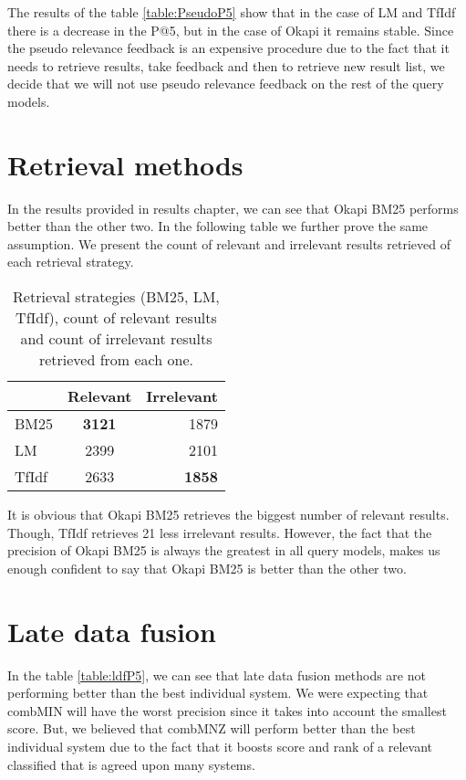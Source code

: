 The results of the table \ref{table:PseudoP5} show that in the case of LM and TfIdf there is a decrease in the P@5, but in the case of Okapi it remains stable. Since the pseudo relevance feedback is an expensive procedure due to the fact that it needs to retrieve results, take feedback and then to retrieve new result list, we decide that we will not use pseudo relevance feedback on the rest of the query models.



\section{Retrieval methods}

In the results provided in results chapter, we can see that Okapi BM25 performs better than the other two. In the following table we further prove the same assumption. We present the count of relevant and irrelevant results retrieved of each retrieval strategy.

\begin{table}[H]
\begin{center}
\caption{Retrieval strategies (BM25, LM, TfIdf), count of relevant results and count of irrelevant results retrieved from each one.}

\begin{tabular}{lcr}
\midrule
 & Relevant & Irrelevant  \\
\midrule
	BM25 & \textbf{3121} & 1879 \\
	LM & 2399 & 2101 \\
	TfIdf & 2633 & \textbf{1858} \\
\bottomrule
\end{tabular}
\end{center}
\end{table}

It is obvious that Okapi BM25 retrieves the biggest number of relevant results. Though, TfIdf retrieves 21 less irrelevant results. However, the fact that the precision of Okapi BM25 is always the greatest in all query models, makes us enough confident to say that Okapi BM25 is better than the other two.

\section{Late data fusion}

In the table \ref{table:ldfP5}, we can see that late data fusion methods are not performing better than the best individual system. We were expecting that combMIN will have the worst precision since it takes into account the smallest score. But, we believed that combMNZ will perform better than the best individual system due to the fact that it boosts score and rank of a relevant classified that is agreed upon many systems.

